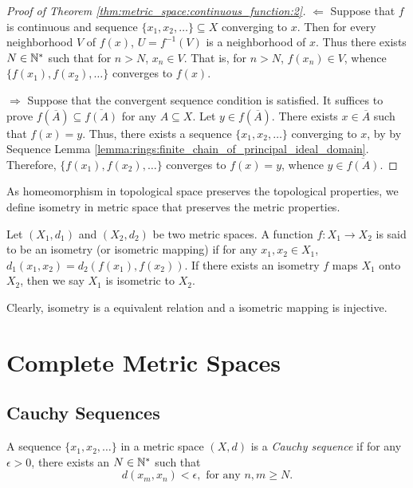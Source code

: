 \begin{proof}[Proof of Theorem \ref{thm:metric_space:continuous_function:2}]
$\Leftarrow$ 
Suppose that $f$ is continuous and sequence $\{x_1, x_2, \ldots\} \subseteq X$ 
converging to $x$. 
Then for every neighborhood $V$ of $f(x)$, $U = f^{-1}(V)$ is a 
neighborhood of $x$. 
Thus there exists $N \in \mathbb{N}^\ast$ such that for $n > N$, $x_n \in V$. 
That is, for $n > N$, $f(x_n) \in V$, whence $\{f(x_1), f(x_2), \ldots\}$ 
converges to $f(x)$. 

$\Rightarrow$ 
Suppose that the convergent sequence condition is satisfied. 
It suffices to prove $f(\overline{A}) \subseteq \overline{f(A)}$ for any 
$A \subseteq X$. 
Let $y \in f(\overline{A})$. 
There exists $x \in \overline{A}$ such that $f(x) = y$. 
Thus, there exists a sequence $\{x_1, x_2, \ldots\}$ converging to $x$, by 
by Sequence Lemma \ref{lemma:rings:finite_chain_of_principal_ideal_domain}. 
Therefore, $\{f(x_1), f(x_2), \ldots\}$ converges to $f(x) = y$, whence 
$y \in \overline{f(A)}$. 
\end{proof}

As homeomorphism in topological space preserves the topological properties, 
we define isometry in metric space that preserves the metric properties. 
\begin{defn}
Let $(X_1, d_1)$ and $(X_2, d_2)$ be two metric spaces. 
A function $f: X_1 \to X_2$ is said to be an isometry (or isometric mapping) 
if for any $x_1, x_2 \in X_1$, $d_1(x_1, x_2) = d_2(f(x_1), f(x_2))$. 
If there exists an isometry $f$ maps $X_1$ onto $X_2$, then we say $X_1$ is 
isometric to $X_2$. 
\end{defn}
Clearly, isometry is a equivalent relation and a isometric mapping is 
injective. 

\section{Complete Metric Spaces}
\subsection{Cauchy Sequences}
\begin{defn}
A sequence $\{x_1, x_2, \ldots\}$ in a metric space $(X, d)$ is a 
\emph{Cauchy sequence} if for any $\epsilon > 0$, there exists an $N \in \mathbb{N} 
^\ast$ such that 
\begin{equation*}
    d(x_m, x_n) < \epsilon, \text{ for any } n, m \ge N. 
\end{equation*}
\end{defn}

